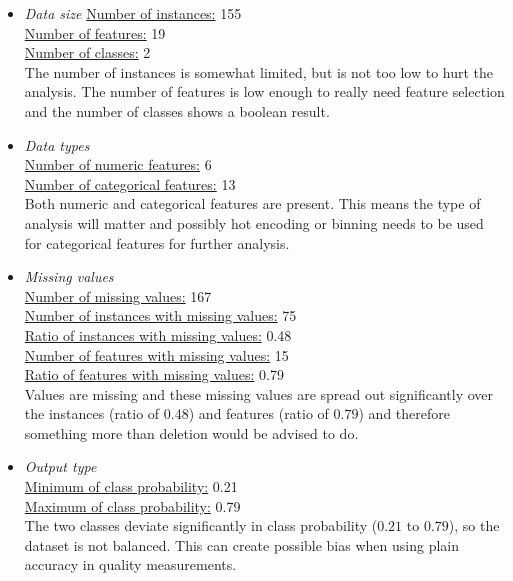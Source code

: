 \documentclass[10pt,a4paper]{report}
\begin{document}
	\begin{itemize}
		\item \textit{Data size}
		\underline{Number of instances:} 155 \\
		\underline{Number of features:} 19\\
		\underline{Number of classes:} 2\\
		
		The number of instances is somewhat limited, but is not too low to hurt the analysis. The number of features is low enough to really need feature selection and the number of classes shows a boolean result.
		
		\item \textit{Data types} \\
		\underline{Number of numeric features:} 6 \\
		\underline{Number of categorical features:} 13 \\
		
		Both numeric and categorical features are present. This means the type of analysis will matter and possibly hot encoding or binning needs to be used for categorical features for further analysis.
		
		\item \textit{Missing values} \\
		\underline{Number of missing values:} 167 \\
		\underline{Number of instances with missing values:} 75 \\
		\underline{Ratio of instances with missing values:} 0.48 \\
		\underline{Number of features with missing values:} 15 \\
		\underline{Ratio of features with missing values:} 0.79 \\
		
		Values are missing and these missing values are spread out significantly over the instances (ratio of $0.48$) and features (ratio of $0.79$) and therefore something more than deletion would be advised to do.
		
		\item \textit{Output type} \\
		\underline{Minimum of class probability:} 0.21 \\
		\underline{Maximum of class probability:} 0.79 \\
		
		The two classes deviate significantly in class probability ($0.21$ to $0.79$), so the dataset is not balanced. This can create possible bias when using plain accuracy in quality measurements.
		

\end{itemize}
\end{document}
